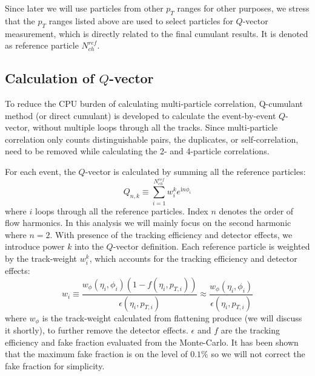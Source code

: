 Since later we will use particles from other $p_{T}$ ranges for other purposes, we stress that the $p_{T}$ ranges listed above are used to select particles for $Q$-vector measurement, which is directly related to the final cumulant results. It is denoted as reference particle $N_{ch}^{ref}$.

\subsection{Calculation of $Q$-vector}
To reduce the CPU burden of calculating multi-particle correlation, Q-cumulant method (or direct cumulant) is developed to calculate the event-by-event $Q$-vector, without multiple loops through all the tracks. Since multi-particle correlation only counts distinguishable pairs, the duplicates, or self-correlation, need to be removed while calculating the 2- and 4-particle correlations.

For each event, the $Q$-vector is calculated by summing all the reference particles:
\begin{equation}
Q_{n,k}\equiv\sum_{i=1}^{N_{ch}^{ref}} w_{i}^{k}e^{\text{i}n\phi_{i}}
\end{equation}
where $i$ loops through all the reference particles. Index $n$ denotes the order of flow harmonics. In this analysis we will mainly focus on the second harmonic where $n=2$. With presence of the tracking efficiency and detector effects, we introduce power $k$ into the $Q$-vector definition. Each reference particle is weighted by the track-weight $w_{i}^{k}$, which accounts for the tracking efficiency and detector effects:
\begin{equation}
w_{i}\equiv\frac{w_{\phi}(\eta_{i},\phi_{i})(1-f(\eta_{i},p_{T,i}))}{\epsilon(\eta_{i},p_{T,i})}\approx\frac{w_{\phi}(\eta_{i},\phi_{i})}{\epsilon(\eta_{i},p_{T,i})}
\end{equation}
where $w_{\phi}$ is the track-weight calculated from flattening produce (we will discuss it shortly), to further remove the detector effects. $\epsilon$ and $f$ are the tracking efficiency and fake fraction evaluated from the Monte-Carlo. It has been shown that the maximum fake fraction is on the level of $0.1\%$ so we will not correct the fake fraction for simplicity.

